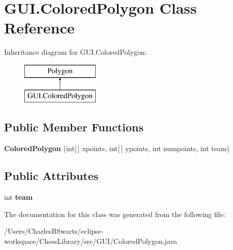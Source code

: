 \hypertarget{class_g_u_i_1_1_colored_polygon}{}\section{G\+U\+I.\+Colored\+Polygon Class Reference}
\label{class_g_u_i_1_1_colored_polygon}
Inheritance diagram for G\+U\+I.\+Colored\+Polygon\+:\begin{figure}[H]
\begin{center}
\leavevmode
\includegraphics[height=2.000000cm]{class_g_u_i_1_1_colored_polygon}
\end{center}
\end{figure}
\subsection*{Public Member Functions}
\begin{DoxyCompactItemize}
\item 
\mbox{\label{class_g_u_i_1_1_colored_polygon_ae79731531f6cc08cbbf0ca6e24856256}} 
{\bfseries Colored\+Polygon} (int\mbox{[}$\,$\mbox{]} xpoints, int\mbox{[}$\,$\mbox{]} ypoints, int numpoints, int team)
\end{DoxyCompactItemize}
\subsection*{Public Attributes}
\begin{DoxyCompactItemize}
\item 
\mbox{\label{class_g_u_i_1_1_colored_polygon_a6576e0c0d2970d3920b759aabf9f7a7d}} 
int {\bfseries team}
\end{DoxyCompactItemize}


The documentation for this class was generated from the following file\+:\begin{DoxyCompactItemize}
\item 
/\+Users/\+Charles\+B\+Swarts/eclipse-\/workspace/\+Chess\+Library/src/\+G\+U\+I/Colored\+Polygon.\+java\end{DoxyCompactItemize}
